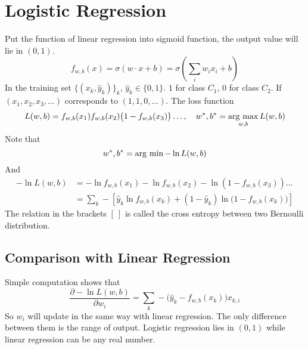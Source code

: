 \documentclass[../main.tex]{subfiles}
\begin{document}
    \section{Logistic Regression}
        Put the function of linear regression into sigmoid function, the output value will lie in $(0,1)$.
        \[
            f_{w,b}(x)=\sigma(w \cdot x + b)=\sigma\left(\sum_i w_ix_i+b\right)
        \]
        In the training set $\{(x_k,\hat{y}_k)\}_k$, $\hat{y}_k\in\{0,1\}$. $1$ for class $C_1$, $0$ for class $C_2$. If $(x_1,x_2,x_3,\dots)$ corresponds to $(1,1,0,\dots)$. The loss function
        \[
            L(w,b) = f_{w,b}(x_1)f_{w,b}(x_2)\big(1-f_{w,b}(x_3)\big)\dots,\quad w^*,b^*=\operatorname*{arg~max}_{w,b}L(w,b)
        \]
        Note that
        \[
            w^*,b^*=\operatorname*{arg~min} -\ln L(w,b)
        \]
        And
        \begin{align*}
            -\ln L(w,b) &= -\ln f_{w,b}(x_1)-\ln f_{w,b}(x_2)-\ln(1-f_{w,b}(x_3))\dots\\
                        &= \sum_{k}-\left[\hat{y}_k \ln f_{w,b}(x_k)+(1-\hat{y}_k)\ln \big(1-f_{w,b}(x_k)\big)\right]
        \end{align*}
        The relation in the brackets $[~]$ is called the cross entropy between two Bernoulli distribution.
        
        \subsection{Comparison with Linear Regression}
            Simple computation shows that
            \[
                \frac{\partial -\ln L(w,b)}{\partial w_i}=\sum_k -\big(\hat{y}_k-f_{w,b}(x_k)\big)x_{k,i}
            \]
            So $w_i$ will update in the same way with linear regression. The only difference between them is the range of output. Logistic regression lies in $(0,1)$ while linear regression can be any real number.
\end{document}
